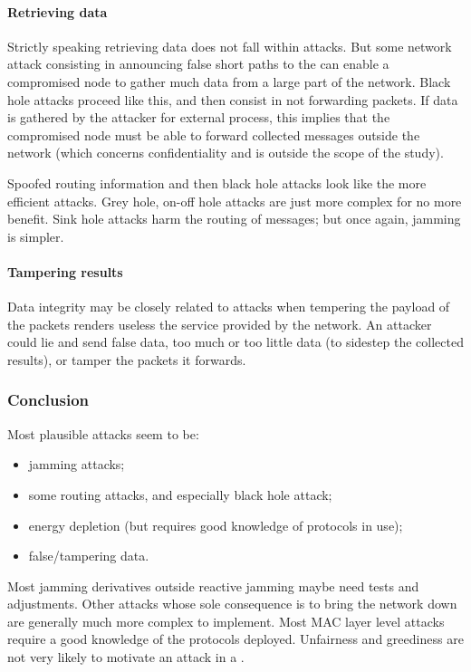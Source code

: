 \paragraph{Retrieving data}
Strictly speaking retrieving data does not fall within \dos attacks.
But some network attack consisting in announcing false short paths to the \bs can enable a compromised node to gather much data from a large part of the network.
Black hole attacks proceed like this, and then consist in not forwarding packets.
If data is gathered by the attacker for external process, this implies that the compromised node must be able to forward collected messages outside the network (which concerns confidentiality and is outside the scope of the study).

Spoofed routing information and then black hole attacks look like the more efficient attacks.
Grey hole, on-off hole attacks are just more complex for no more benefit.
Sink hole attacks harm the routing of messages; but once again, jamming is simpler.

\paragraph{Tampering results}
Data integrity may be closely related to \dos attacks when tempering the payload of the packets renders useless the service provided by the network.
An attacker could lie and send false data, too much or too little data (to sidestep the collected results), or tamper the packets it forwards.


\subsubsection{Conclusion}

Most plausible attacks seem to be:
\begin{itemize}
	\item jamming attacks;
	\item some routing attacks, and especially black hole attack;
	\item energy depletion (but requires good knowledge of protocols in use);
	\item false/tampering data.
\end{itemize}

Most jamming derivatives outside reactive jamming maybe need tests and adjustments.
Other attacks whose sole consequence is to bring the network down are generally much more complex to implement.
Most MAC layer level attacks require a good knowledge of the protocols deployed.
Unfairness and greediness are not very likely to motivate an attack in a \wsn.
